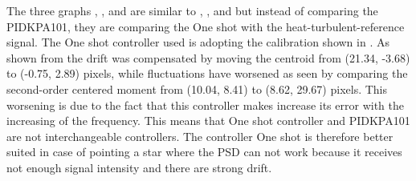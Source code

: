 The three graphs , , and  are similar to , , and  but instead of comparing the PIDKPA101, they are comparing the One shot with the heat-turbulent-reference signal. The One shot controller used is adopting the calibration shown in .
As shown from  the drift was compensated by moving the centroid from (21.34, -3.68) to (-0.75, 2.89) pixels, while fluctuations have worsened as seen by comparing the second-order centered moment from (10.04, 8.41) to (8.62, 29.67) pixels.
This worsening is due to the fact that this controller makes increase its error with the increasing of the frequency.
This means that One shot controller and PIDKPA101 are not interchangeable controllers. The controller One shot is therefore better suited in case of pointing a star where the PSD can not work because it receives not enough signal intensity and there are strong drift.




